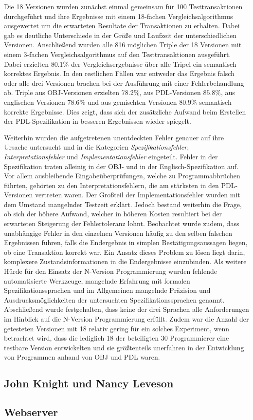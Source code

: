 %
Die 18 Versionen wurden zunächst einmal gemeinsam für 100 Testtransaktionen durchgeführt und ihre Ergebnisse mit einem 18-fachen Vergleichsalgorithmus ausgewertet um die erwarteten Resultate der Transaktionen zu erhalten.
Dabei gab es deutliche Unterschiede in der Größe und Laufzeit der unterschiedlichen Versionen.
Anschließend wurden alle 816 möglichen Triple der 18 Versionen mit einem 3-fachen Vergleichsalgorithmus auf den Testtransaktionen ausgeführt. Dabei erzielten $80.1\%$ der Vergleichsergebnisse über alle Tripel ein semantisch korrektes Ergebnis. In den restlichen Fällen war entweder das Ergebnis falsch oder alle drei Versionen brachen bei der Ausführung mit einer Fehlerbehandlung ab. Triple aus OBJ-Versionen erzielten $78.2\%$, aus PDL-Versionen $85.8\%$, aus englischen Versionen $78.6\%$ und aus gemischten Versionen $80.9\%$ semantisch korrekte Ergebnisse. Dies zeigt, dass sich der zusätzliche Aufwand beim Erstellen der PDL-Spezifikation in besseren Ergebnissen wieder spiegelt.
%

%
Weiterhin wurden die aufgetretenen unentdeckten Fehler genauer auf ihre Ursache untersucht und in die Kategorien \emph{Spezifikationsfehler}, \emph{Interpretationsfehler} und \emph{Implementationsfehler} eingeteilt.
Fehler in der Spezifikation traten alleinig in der OBJ- und in der Englisch-Spezifikation auf.
Vor allem ausbleibende Eingabeüberprüfungen, welche zu Programmabbrüchen führten, gehörten zu den Interpretationsfehlern, die am stärksten in den PDL-Versionen vertreten waren.
Der Großteil der Implementationsfehler wurden mit dem Umstand mangelnder Testzeit erklärt.
Jedoch bestand weiterhin die Frage, ob sich der höhere Aufwand, welcher in höheren Kosten resultiert bei der erwarteten Steigerung der Fehlertoleranz lohnt.
Beobachtet wurde zudem, dass unabhängige Fehler in den einzelnen Versionen häufig zu den selben falschen Ergebnissen führen, falls die Endergebnis in simplen Bestätigungsaussagen liegen, ob eine Transaktion korrekt war. Ein Ansatz dieses Problem zu lösen liegt darin, komplexere Zustandsinformationen in die Endergebnisse einzubinden.
Als weitere Hürde für den Einsatz der N-Version Programmierung wurden fehlende automatisierte Werkzeuge, mangelnde Erfahrung mit formalen Spezifikationssprachen und im Allgemeinen mangelnde Präzision und Ausdrucksmöglichkeiten der untersuchten Spezifikationssprachen genannt.
Abschließend wurde festgehalten, dass keine der drei Sprachen alle Anforderungen im Hinblick auf die N-Version Programmierung erfüllt.
Zudem war die Anzahl der getesteten Versionen mit 18 relativ gering für ein solches Experiment, wenn betrachtet wird, dass die lediglich 18 der beteiligten 30 Programmierer eine testbare Version entwickelten und sie größtenteils unerfahren in der Entwicklung von Programmen anhand von OBJ und PDL waren.
%
\subsection{John Knight und Nancy Leveson}\label{matrixexperiement}



\subsection{Webserver}\label{webserver}